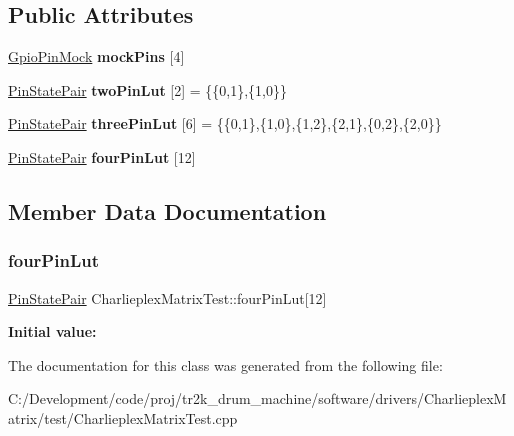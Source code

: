 \subsection*{Public Attributes}
\begin{DoxyCompactItemize}
\item 
\mbox{\label{class_charlieplex_matrix_test_a9c136769d3fa8952cf9559a4d1e04b5a}} 
\mbox{\hyperlink{class_gpio_pin_mock}{Gpio\+Pin\+Mock}} {\bfseries mock\+Pins} \mbox{[}4\mbox{]}
\item 
\mbox{\label{class_charlieplex_matrix_test_a2fefb8337380f409fd0a4ef274c76f0a}} 
\mbox{\hyperlink{struct_pin_state_pair}{Pin\+State\+Pair}} {\bfseries two\+Pin\+Lut} \mbox{[}2\mbox{]} = \{\{0,1\},\{1,0\}\}
\item 
\mbox{\label{class_charlieplex_matrix_test_a1473bf46a02e4e3ed0bb8173512b43b8}} 
\mbox{\hyperlink{struct_pin_state_pair}{Pin\+State\+Pair}} {\bfseries three\+Pin\+Lut} \mbox{[}6\mbox{]} = \{\{0,1\},\{1,0\},\{1,2\},\{2,1\},\{0,2\},\{2,0\}\}
\item 
\mbox{\hyperlink{struct_pin_state_pair}{Pin\+State\+Pair}} {\bfseries four\+Pin\+Lut} \mbox{[}12\mbox{]}
\end{DoxyCompactItemize}


\subsection{Member Data Documentation}
\mbox{\label{class_charlieplex_matrix_test_a50afdf0629547434553340c94f4d02bd}} 
\subsubsection{\texorpdfstring{fourPinLut}{fourPinLut}}
{\footnotesize\ttfamily \mbox{\hyperlink{struct_pin_state_pair}{Pin\+State\+Pair}} Charlieplex\+Matrix\+Test\+::four\+Pin\+Lut\mbox{[}12\mbox{]}}

{\bfseries Initial value\+:}
\begin{DoxyCode}{0}
\DoxyCodeLine{= \{}

\end{DoxyCode}


The documentation for this class was generated from the following file\+:\begin{DoxyCompactItemize}
\item 
C\+:/\+Development/code/proj/tr2k\+\_\+drum\+\_\+machine/software/drivers/\+Charlieplex\+Matrix/test/Charlieplex\+Matrix\+Test.\+cpp\end{DoxyCompactItemize}
